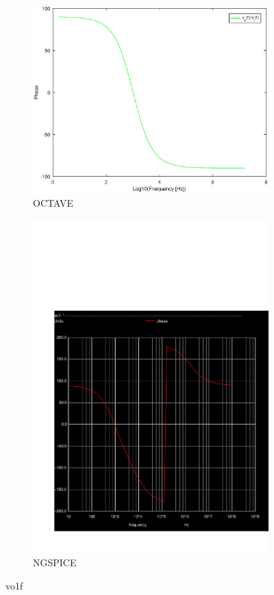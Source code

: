 
\begin{figure}[H] 
\centering
\begin{subfigure}{0.3\textwidth}
\includegraphics[width=\textwidth]{phase.eps}
\caption{OCTAVE}
\label{Octave_vo1f}
\end{subfigure}
\begin{subfigure}{0.3\textwidth}
\includegraphics[width=\textwidth]{phase.pdf}
\caption{NGSPICE}
\label{Ngspice_vo1f}
\end{subfigure}
\caption{vo1f}
\end{figure}



